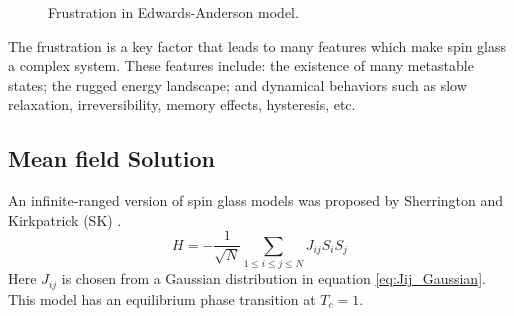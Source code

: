 \begin{figure}
  \centering
  \hspace{0.5cm}
  \caption{Frustration in Edwards-Anderson model.}
  \label{fig:frustration}
\end{figure}

The frustration is a key factor that leads to many features which make 
spin glass a complex system.
These features include: the existence of many metastable states; the rugged energy 
landscape; and dynamical behaviors such as slow relaxation, irreversibility, 
memory effects, hysteresis, etc. 


\subsection{Mean field Solution}
\label{sec:meanfield-model}

An infinite-ranged version of spin glass models 
was proposed by Sherrington and Kirkpatrick (SK) \cite{Sherrington-Kirkpatrick-1975,Sherrington-Kirkpatrick1978}.
\begin{equation}
  \label{eq:SK}
  H=-\frac{1}{\sqrt{N}}\sum_{1\le i\le j\le N}J_{ij}S_iS_j
\end{equation}
Here $J_{ij}$ is chosen from a Gaussian distribution in equation 
\ref{eq:Jij_Gaussian}.
This model has an equilibrium phase transition at $T_c = 1$.


